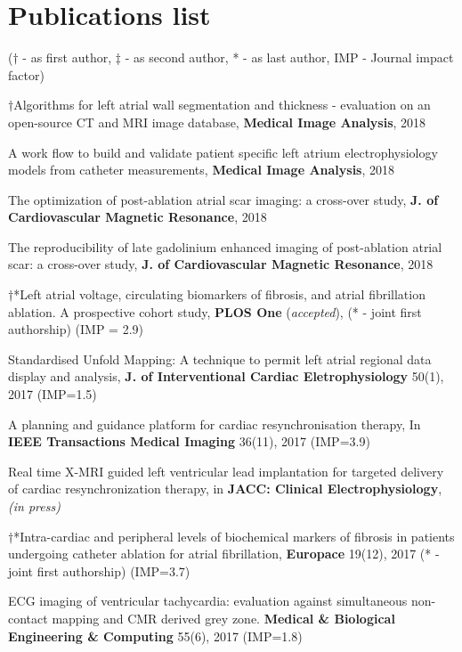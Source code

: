 \newpage
{}
\renewcommand{\theenumi}{J\arabic{enumi}}
\section{Publications list}
($\dagger$ - as first author, $\ddagger$ - as second author, * - as last author, IMP - Journal impact factor)\\[2mm]
\begin{etaremune}
\item $\dagger$Algorithms for left atrial wall segmentation and thickness - evaluation on an open-source CT and MRI image database, \textbf{Medical Image Analysis}, 2018
\item A work flow to build and validate patient specific left atrium electrophysiology models from catheter measurements, \textbf{Medical Image Analysis}, 2018
\item The optimization of post-ablation atrial scar imaging: a cross-over study, \textbf{J. of Cardiovascular Magnetic Resonance}, 2018
\item The reproducibility of late gadolinium enhanced imaging of post-ablation atrial scar: a cross-over study, \textbf{J. of Cardiovascular Magnetic Resonance}, 2018
\item $\dagger$*Left atrial voltage, circulating biomarkers of fibrosis, and atrial fibrillation ablation. A prospective cohort study, \textbf{PLOS One} (\textit{accepted}), (* - joint first authorship) (IMP = 2.9)
\item Standardised Unfold Mapping: A technique to permit left atrial regional data display and analysis, \textbf{J. of Interventional Cardiac Eletrophysiology}  50(1), 2017 (IMP=1.5)
\item A planning and guidance platform for cardiac resynchronisation therapy, In \textbf{IEEE Transactions Medical Imaging} 36(11), 2017 (IMP=3.9)
\item Real time X-MRI guided left ventricular lead implantation for targeted delivery of cardiac resynchronization therapy, in \textbf{JACC: Clinical Electrophysiology}, \textit{(in press)}
\item $\dagger$*Intra-cardiac and peripheral levels of biochemical markers of fibrosis in patients undergoing catheter ablation for atrial fibrillation, \textbf{Europace} 19(12), 2017 (* - joint first authorship) (IMP=3.7)
\item ECG imaging of ventricular tachycardia: evaluation against simultaneous non-contact mapping and CMR derived grey zone. \textbf{Medical \& Biological Engineering \& Computing} 55(6), 2017 (IMP=1.8)

\end{etaremune}
